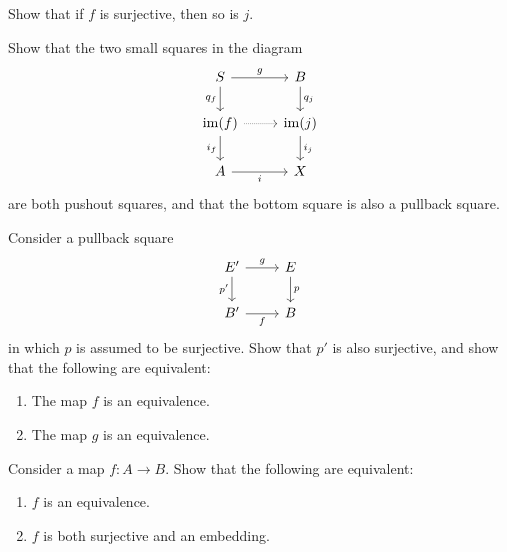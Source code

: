 \begin{exercises}
  \begin{subexenum}
  \item Show that if $f$ is surjective, then so is $j$.
  \item Show that the two small squares in the diagram
    \begin{equation*}
      \begin{tikzcd}
        S \arrow[r,"g"] \arrow[d,swap,"q_f"] & B \arrow[d,"q_j"] \\
        \im(f) \arrow[r,densely dotted] \arrow[d,swap,"i_f"] & \im(j) \arrow[d,"i_j"] \\
        A \arrow[r,swap,"i"] & X
      \end{tikzcd}
    \end{equation*}
    are both pushout squares, and that the bottom square is also a pullback square.
  \end{subexenum}
  \exercise Consider a pullback square
  \begin{equation*}
    \begin{tikzcd}
      E' \arrow[d,swap,"{p'}"] \arrow[r,"g"] & E \arrow[d,"p"] \\
      B' \arrow[r,swap,"f"] & B
    \end{tikzcd}
  \end{equation*}
  in which $p$ is assumed to be surjective. Show that $p'$ is also surjective, and show that the following are equivalent:
  \begin{enumerate}
  \item The map $f$ is an equivalence.
  \item The map $g$ is an equivalence.
  \end{enumerate}
  \exercise
  Consider a map $f:A\to B$. Show that the following are equivalent:
  \begin{enumerate}
  \item $f$ is an equivalence.
  \item $f$ is both surjective and an embedding.
  \end{enumerate}
\end{exercises}

\endinput

\begin{thm}
Consider a commuting triangle
\begin{equation*}
\begin{tikzcd}[column sep=small]
A \arrow[rr,"i"] \arrow[dr,swap,"f"] & & B \arrow[dl,"m"] \\
& X
\end{tikzcd}
\end{equation*}
with $I:f\htpy m\circ i$, where $m$ is an embedding. The following are equivalent:
\begin{enumerate}
\item $m$ satisfies the universal property of the image of $f$.
\item for each $x:X$, the proposition $\fib{m}{x}$ satisfies the universal property of the propositional truncation of $\fib{f}{x}$.
\end{enumerate}
\end{thm}
